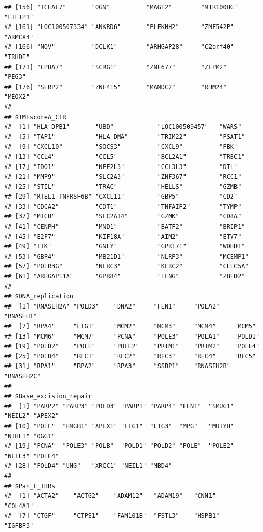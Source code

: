 \documentclass[
  12pt,
]{book}
\theoremstyle{definition}
\theoremstyle{definition}
\theoremstyle{definition}
\theoremstyle{definition}
\theoremstyle{remark}
\begin{document}
\begin{verbatim}
## [156] "TCEAL7"       "OGN"          "MAGI2"        "MIR100HG"     "FILIP1"      
## [161] "LOC100507334" "ANKRD6"       "PLEKHH2"      "ZNF542P"      "ARMCX4"      
## [166] "NOV"          "DCLK1"        "ARHGAP28"     "C2orf40"      "TRHDE"       
## [171] "EPHA7"        "SCRG1"        "ZNF677"       "ZFPM2"        "PEG3"        
## [176] "SERP2"        "ZNF415"       "MAMDC2"       "RBM24"        "MEOX2"       
## 
## $TMEscoreA_CIR
##  [1] "HLA-DPB1"       "UBD"            "LOC100509457"   "WARS"          
##  [5] "TAP1"           "HLA-DMA"        "TRIM22"         "PSAT1"         
##  [9] "CXCL10"         "SOCS3"          "CXCL9"          "PBK"           
## [13] "CCL4"           "CCL5"           "BCL2A1"         "TRBC1"         
## [17] "IDO1"           "NFE2L3"         "CCL3L3"         "DTL"           
## [21] "MMP9"           "SLC2A3"         "ZNF367"         "RCC1"          
## [25] "STIL"           "TRAC"           "HELLS"          "GZMB"          
## [29] "RTEL1-TNFRSF6B" "CXCL11"         "GBP5"           "CD2"           
## [33] "CDCA2"          "CDT1"           "TNFAIP2"        "TYMP"          
## [37] "MICB"           "SLC2A14"        "GZMK"           "CD8A"          
## [41] "CENPH"          "MND1"           "BATF2"          "BRIP1"         
## [45] "E2F7"           "KIF18A"         "AIM2"           "ETV7"          
## [49] "ITK"            "GNLY"           "GPR171"         "WDHD1"         
## [53] "GBP4"           "MB21D1"         "NLRP3"          "MCEMP1"        
## [57] "POLR3G"         "NLRC3"          "KLRC2"          "CLEC5A"        
## [61] "ARHGAP11A"      "GPR84"          "IFNG"           "ZBED2"         
## 
## $DNA_replication
##  [1] "RNASEH2A" "POLD3"    "DNA2"     "FEN1"     "POLA2"    "RNASEH1" 
##  [7] "RPA4"     "LIG1"     "MCM2"     "MCM3"     "MCM4"     "MCM5"    
## [13] "MCM6"     "MCM7"     "PCNA"     "POLE3"    "POLA1"    "POLD1"   
## [19] "POLD2"    "POLE"     "POLE2"    "PRIM1"    "PRIM2"    "POLE4"   
## [25] "POLD4"    "RFC1"     "RFC2"     "RFC3"     "RFC4"     "RFC5"    
## [31] "RPA1"     "RPA2"     "RPA3"     "SSBP1"    "RNASEH2B" "RNASEH2C"
## 
## $Base_excision_repair
##  [1] "PARP2" "PARP3" "POLD3" "PARP1" "PARP4" "FEN1"  "SMUG1" "NEIL2" "APEX2"
## [10] "POLL"  "HMGB1" "APEX1" "LIG1"  "LIG3"  "MPG"   "MUTYH" "NTHL1" "OGG1" 
## [19] "PCNA"  "POLE3" "POLB"  "POLD1" "POLD2" "POLE"  "POLE2" "NEIL3" "POLE4"
## [28] "POLD4" "UNG"   "XRCC1" "NEIL1" "MBD4" 
## 
## $Pan_F_TBRs
##  [1] "ACTA2"    "ACTG2"    "ADAM12"   "ADAM19"   "CNN1"     "COL4A1"  
##  [7] "CTGF"     "CTPS1"    "FAM101B"  "FSTL3"    "HSPB1"    "IGFBP3"  

\end{verbatim}
\end{document}
